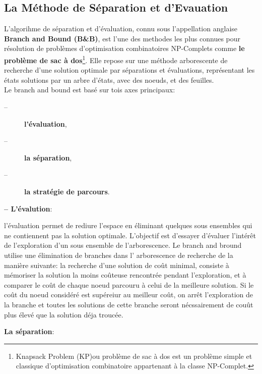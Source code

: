 \documentclass[a4paper,11pt,oneside]{report}
\theoremstyle{plain}
\newcommand{\0}{/ \! \! \! 0}
\theoremstyle{plain}
\begin{document}
\subsection{La M\'ethode de S\'eparation et d'Evauation}
 L'algorihme de s\'eparation et d'\'evaluation, connu sous l'appellation anglaise {\bf Branch and Bound (B\&B)}, est l'une des methodes les plus
 connues pour r\'esolution de probl\`emes d'optimisation combinatoires NP-Complets comme {\bf le probl\`eme de sac \`a dos}\footnote{Knapsack Problem 
  (KP)ou probl\`eme de sac \`a dos est un probl\`eme simple et classique d'optimisation combinatoire appartenant \`a la classe NP-Complet.}.
 Elle repose sur une m\'ethode arborescente de recherche d'une solution optimale par s\'eparations et \'evaluations, repr\'esentant les \'etats 
 solutions par un arbre d'\'etats, avec des noeuds, et des feuilles.\\
  Le branch and bound est bas\'e sur tois axes principaux:
  \begin{description}
   \item[--] {\bf l'\'evaluation},
   \item[--] {\bf la s\'eparation},
   \item[--] {\bf la strat\'egie de parcours}.
  \end{description}
 {\bf -- L'\'evalution}:
  \begin{description}
  \item l'\'evaluation permet de rediure l'espace en \'eliminant quelques sous ensembles qui ne contiennent pas la solution optimale. L'objectif est d'essayer
   d'\'evaluer l'int\'er\^et de l'exploration d'un sous ensemble de l'arborescence. Le branch and bround utilise une \'elimination de branches dans l'
   arborescence de recherche de la mani\`ere suivante: la recherche d'une solution de co\^ut minimal, consiste \`a m\'emoriser la solution la moins
   co\^uteuse rencontr\'ee pendant l'exploration, et \`a comparer le co\^ut de chaque noeud parcouru \`a celui de la meilleure solution. Si le co\^ut du
   noeud consid\'er\'e est sup\'ereiur au meilleur co\^ut, on arr\^et l'exploration de la branche et toutes les solutions de cette branche seront 
   n\'ecssairement de cou\^ut plus \'elev\'e que la solution d\'eja trouc\'ee. 
  \end{description}
 {\bf La s\'eparation}:
\end{document}
